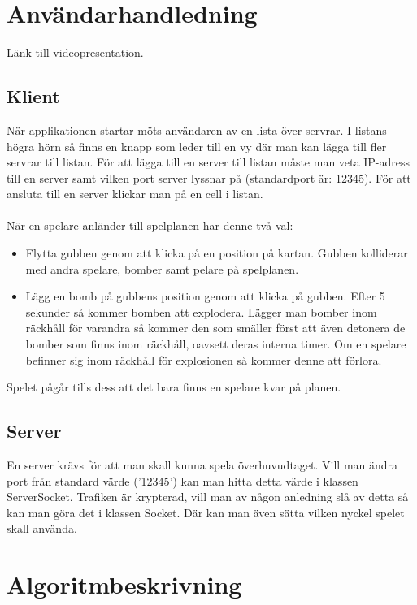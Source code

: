 \documentclass[10pt, titlepage, oneside, a4paper]{article}
\begin{document}
		
    \section{Användarhandledning}
    \href{https://www.youtube.com/watch?v=ExhOKXWXvTQ}{\color{blue}Länk till videopresentation.}
    	\subsection{Klient}
    		När applikationen startar möts användaren av en lista över servrar. I listans högra hörn så finns en knapp som leder till en vy där man kan lägga till fler servrar till listan. För att lägga till en server till listan måste man veta IP-adress till en server samt vilken port server lyssnar på (standardport är: 12345). För att ansluta till en server klickar man på en cell i listan.\\\\När en spelare anländer till spelplanen har denne två val:
    		\begin{itemize}
    			\item Flytta gubben genom att klicka på en position på kartan. Gubben kolliderar med andra spelare, bomber samt pelare på spelplanen.
    			\item Lägg en bomb på gubbens position genom att klicka på gubben. Efter 5 sekunder så kommer bomben att explodera. Lägger man bomber inom räckhåll för varandra så kommer den som smäller först att även detonera de bomber som finns inom räckhåll, oavsett deras interna timer. Om en spelare befinner sig inom räckhåll för explosionen så kommer denne att förlora.
    		\end{itemize}
    		
    		Spelet pågår tills dess att det bara finns en spelare kvar på planen.
    		
    	\subsection{Server}
    		En server krävs för att man skall kunna spela överhuvudtaget. Vill man ändra port från standard värde ('12345') kan man hitta detta värde i klassen ServerSocket. Trafiken är krypterad, vill man av någon anledning slå av detta så kan man göra det i klassen Socket. Där kan man även sätta vilken nyckel spelet skall använda.
    		
    	\newpage
    	
    \section{Algoritmbeskrivning}
\end{document}
